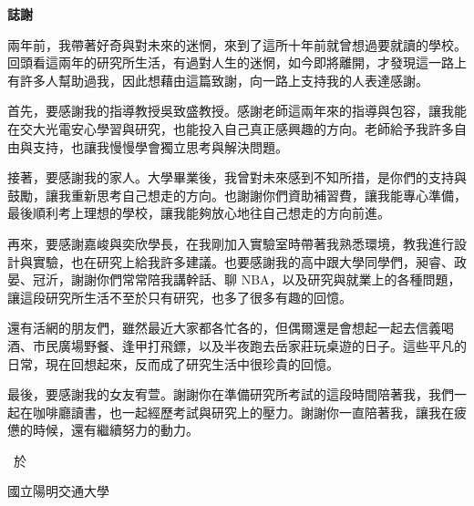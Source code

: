\thispagestyle{empty}

\begin{center}
\Large
\textbf{誌\hspace{1cm}謝}
\end{center}


\linespread{2}%
\selectfont
\hspace{0.25cm}

兩年前，我帶著好奇與對未來的迷惘，來到了這所十年前就曾想過要就讀的學校。回頭看這兩年的研究所生活，有過對人生的迷惘，如今即將離開，才發現這一路上有許多人幫助過我，因此想藉由這篇致謝，向一路上支持我的人表達感謝。

首先，要感謝我的指導教授吳致盛教授。感謝老師這兩年來的指導與包容，讓我能在交大光電安心學習與研究，也能投入自己真正感興趣的方向。老師給予我許多自由與支持，也讓我慢慢學會獨立思考與解決問題。

接著，要感謝我的家人。大學畢業後，我曾對未來感到不知所措，是你們的支持與鼓勵，讓我重新思考自己想走的方向。也謝謝你們資助補習費，讓我能專心準備，最後順利考上理想的學校，讓我能夠放心地往自己想走的方向前進。

再來，要感謝嘉峻與奕欣學長，在我剛加入實驗室時帶著我熟悉環境，教我進行設計與實驗，也在研究上給我許多建議。也要感謝我的高中跟大學同學們，昶睿、政晏、冠沂，謝謝你們常常陪我講幹話、聊 NBA，以及研究與就業上的各種問題，讓這段研究所生活不至於只有研究，也多了很多有趣的回憶。

還有活網的朋友們，雖然最近大家都各忙各的，但偶爾還是會想起一起去信義喝酒、市民廣場野餐、逢甲打飛鏢，以及半夜跑去岳家莊玩桌遊的日子。這些平凡的日常，現在回想起來，反而成了研究生活中很珍貴的回憶。

最後，要感謝我的女友宥萱。謝謝你在準備研究所考試的這段時間陪著我，我們一起在咖啡廳讀書，也一起經歷考試與研究上的壓力。謝謝你一直陪著我，讓我在疲憊的時候，還有繼續努力的動力。

\begin{flushright}
\studentCnName \ 於

國立陽明交通大學\ \NameofDepartmentInstituteCN

\ThesisDateTW
\end{flushright}